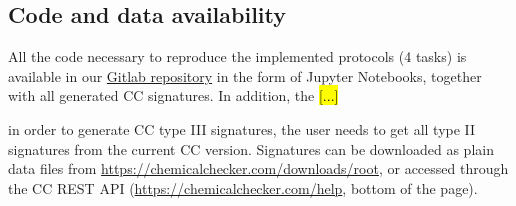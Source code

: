 \subsection{Code and data availability}
\label{Protocols_Code}

All the code necessary to reproduce the implemented protocols (4 tasks) is available in our \href{https://gitlabsbnb.irbbarcelona.org/packages/protocols}{Gitlab repository} in the form of Jupyter Notebooks, together with all generated CC signatures. In addition, the \hl{[...]}




in order to generate CC type III signatures, the user needs to get all type II signatures from the current CC version. Signatures can be downloaded as plain data files from \href{https://chemicalchecker.com/downloads/root}{https://chemicalchecker.com/downloads/root}, or accessed through the CC REST API (\href{https://chemicalchecker.com/help}{https://chemicalchecker.com/help}, bottom of the page).



